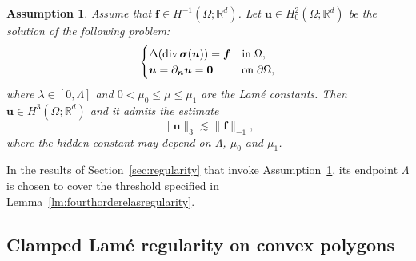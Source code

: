 \documentclass[10pt]{amsart}
\newtheorem{assumption}[theorem]{Assumption}
\renewcommand{\div}{\operatorname{div}}
\numberwithin{equation}{section}
\begin{document}
\begin{assumption}\label{RegularityAssumption2}
	Assume that $\boldsymbol f\in H^{-1}(\Omega; \mathbb R^d)$. Let $\boldsymbol u\in H_0^2(\Omega; \mathbb R^d)$ be the solution of the following problem:
	\begin{equation*}
	\begin{cases}
	\Delta (\div\boldsymbol\sigma(\boldsymbol u))=\boldsymbol f & {\rm  in }\; \Omega,\\
	\boldsymbol u=\partial_{\boldsymbol{n}}  \boldsymbol u= \boldsymbol 0 & {\rm on }\; \partial\Omega,
	\end{cases}
	\end{equation*}
	where $\lambda\in[0,\Lambda]$ and $0<\mu_0\leq\mu\leq\mu_1$ are the Lam\'{e} constants. Then $\boldsymbol u\in H^3(\Omega; \mathbb R^d)$ and it admits the estimate
	\[
	\| \boldsymbol u\|_3 \lesssim \|\boldsymbol f\|_{-1},
	\]
	where the hidden constant may depend on $\Lambda$, $\mu_0$ and $\mu_1$.
\end{assumption}

In the results of Section~\ref{sec:regularity} that invoke Assumption~\ref{RegularityAssumption2}, its endpoint $\Lambda$ is chosen to cover the threshold specified in Lemma~\ref{lm:fourthorderelasregularity}.

\subsection{Clamped Lam\'e regularity on convex polygons}
\end{document}
